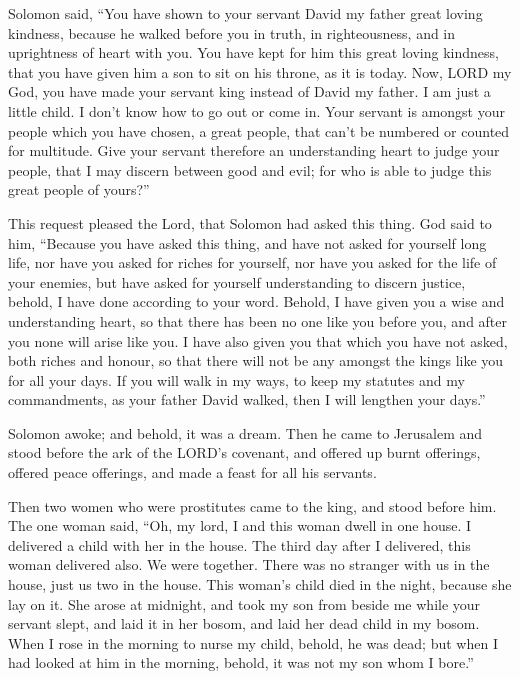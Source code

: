  Solomon said, ``You have shown to your servant David my
father great loving kindness, because he walked before you in truth, in
righteousness, and in uprightness of heart with you. You have kept for
him this great loving kindness, that you have given him a son to sit on
his throne, as it is today.  Now, LORD my God, you have
made your servant king instead of David my father. I am just a little
child. I don't know how to go out or come in.  Your
servant is amongst your people which you have chosen, a great people,
that can't be numbered or counted for multitude.  Give
your servant therefore an understanding heart to judge your people, that
I may discern between good and evil; for who is able to judge this great
people of yours?''

 This request pleased the Lord, that Solomon had asked
this thing.  God said to him, ``Because you have asked
this thing, and have not asked for yourself long life, nor have you
asked for riches for yourself, nor have you asked for the life of your
enemies, but have asked for yourself understanding to discern justice,
 behold, I have done according to your word. Behold, I
have given you a wise and understanding heart, so that there has been no
one like you before you, and after you none will arise like you.
 I have also given you that which you have not asked,
both riches and honour, so that there will not be any amongst the kings
like you for all your days.  If you will walk in my ways,
to keep my statutes and my commandments, as your father David walked,
then I will lengthen your days.''

 Solomon awoke; and behold, it was a dream. Then he came
to Jerusalem and stood before the ark of the LORD's covenant, and
offered up burnt offerings, offered peace offerings, and made a feast
for all his servants.

 Then two women who were prostitutes came to the king,
and stood before him.  The one woman said, ``Oh, my lord,
I and this woman dwell in one house. I delivered a child with her in the
house.  The third day after I delivered, this woman
delivered also. We were together. There was no stranger with us in the
house, just us two in the house.  This woman's child died
in the night, because she lay on it.  She arose at
midnight, and took my son from beside me while your servant slept, and
laid it in her bosom, and laid her dead child in my bosom.
 When I rose in the morning to nurse my child, behold, he
was dead; but when I had looked at him in the morning, behold, it was
not my son whom I bore.''

